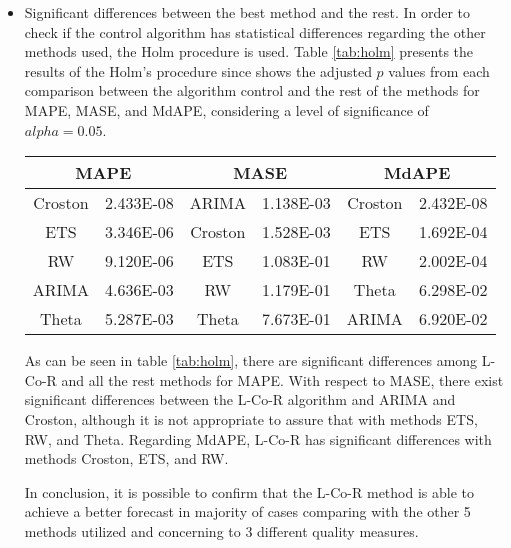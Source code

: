 \documentclass[a4paper,twoside]{article}
\newcommand{\metodo}{L-Co-R}
\begin{document}
\begin{itemize}
  \item Significant differences between the best method and the rest. In order to check if the control algorithm has statistical differences regarding the other methods used, the Holm procedure \cite{Holm1979} is used. Table \ref{tab:holm} presents the results of the Holm's procedure since shows the adjusted $p$ values from each comparison between the algorithm control and the rest of the methods for MAPE, MASE, and MdAPE, considering a level of significance of $alpha=0.05$.

      \begin{table*}[h]
        \caption{Adjusted $p$ values of Holm's procedure between the control algorithm ({\metodo}) and the other methods for MAPE, MASE, and MdAPE. Values lower than $alpha=0.05$ indicate significant differences between {\metodo} and the corresponding algorithm.}
        \label{tab:holm}
        \centering
        \begin{tabular}{|c|c|c|c|c|c|}
         \hline \multicolumn{2}{|c|}{MAPE}   &  \multicolumn{2}{c|}{MASE}  &   \multicolumn{2}{c|}{MdAPE} \\
         \hline Croston &   2.433E-08   &   ARIMA   &   1.138E-03   &   Croston &   2.432E-08\\
         \hline ETS     &   3.346E-06   &   Croston &   1.528E-03   &   ETS     &   1.692E-04\\
         \hline RW      &   9.120E-06   &   ETS     &   1.083E-01   &   RW      &   2.002E-04\\
         \hline ARIMA	&	4.636E-03   &	RW      &   1.179E-01   &   Theta   &   6.298E-02\\
         \hline Theta	&	5.287E-03   &	Theta   &   7.673E-01   &   ARIMA   &   6.920E-02\\
         \hline
        \end{tabular}
    \end{table*}

    As can be seen in table \ref{tab:holm}, there are significant differences among {\metodo} and all the rest methods for MAPE. With respect to MASE, there exist significant differences between the {\metodo} algorithm and ARIMA and Croston, although it is not appropriate to assure that with methods ETS, RW, and Theta. Regarding MdAPE, {\metodo} has significant differences with methods Croston, ETS, and RW.

    In conclusion, it is possible to confirm that the {\metodo} method is able to achieve a better forecast in majority of cases comparing with the other 5 methods utilized and concerning to 3 different quality measures.

\end{itemize}
\end{document}
